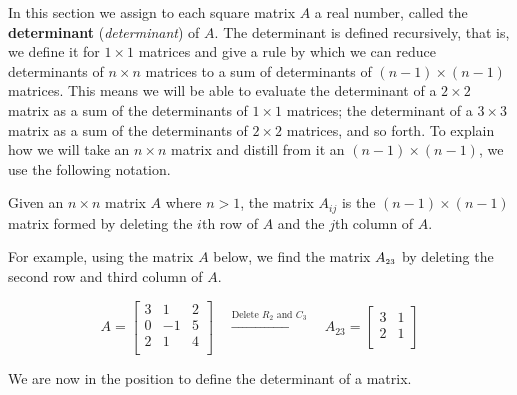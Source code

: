 In this section we assign to each square matrix $A$ a real number, called the \textbf{determinant} (\textit{determinant}) of $A$. The determinant is defined recursively, that is, we define it for $1 \times 1$ matrices and give a rule by which we can reduce determinants of $n \times n$ matrices to a sum of determinants of $(n-1) \times (n-1)$ matrices. This means we will be able to evaluate the determinant of a $2 \times 2$ matrix as a sum of the determinants of $1 \times 1$ matrices;  the determinant of a $3 \times 3$ matrix as a sum of the determinants of $2 \times 2$ matrices, and so forth.  To explain how we will take an $n \times n$ matrix and distill from it an $(n-1) \times (n-1)$, we use the following notation.

\smallskip


\begin{definition}[Matrix $A_{ij}$] \label{Aijdefn} 
Given an $n \times n$ matrix $A$ where $n>1$, the matrix $A_{ij}$ is the $(n-1) \times (n-1)$ matrix formed by deleting the $i$th row of $A$ and the $j$th column of $A$. 
\end{definition}


\smallskip

For example, using the matrix $A$ below, we find the matrix $A_{\mbox{\tiny$23$}}$ by deleting the second row and third column of $A$.

\[ A = \left[ \begin{array}{rrr} 3 &  1 & 2 \\ 0 & -1 & 5 \\ 2 & 1 & 4 \\ \end{array} \right] \quad \xrightarrow{\text{Delete $R_2$ and $C_3$}} \quad
A_{23} = \left[ \begin{array}{rr} 3 & 1 \\ 2 & 1 \\ \end{array} \right] 
\]

We are now in the position to define the determinant of a matrix.

\smallskip

